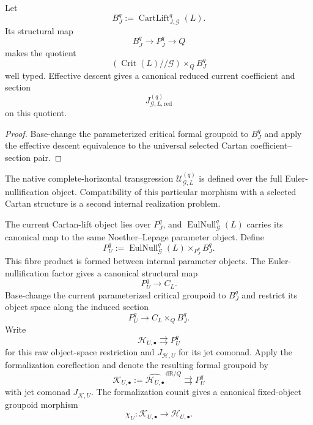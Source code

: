 \begin{theorem}
\label{thm:symmetry-noether-universal-reduced-current}
Let
\[
B_J^q:=\operatorname{CartLift}_{J,\mathcal G}^{q}(L).
\]
Its structural map
\[
B_J^q\to P_J^q\to Q
\]
makes the quotient
\[
\left(
\operatorname{Crit}(L)//\mathcal G
\right)\times_QB_J^q
\]
well typed.  Effective descent gives a canonical reduced current coefficient and
section
\[
\boxed{
J_{\mathcal G,L,\mathrm{red}}^{(q)}
}
\]
on this quotient.
\end{theorem}

\begin{proof}
Base-change the parameterized critical formal groupoid to $B_J^q$ and apply the
effective descent equivalence to the universal selected Cartan
coefficient--section pair.
\end{proof}

The native complete-horizontal transgression
$\mathcal U_{\mathcal G,L}^{(q)}$ is defined over the full
Euler-nullification object.  Compatibility of this particular morphism with a
selected Cartan structure is a second internal realization problem.

\begin{construction}
\label{constr:symmetry-noether-common-parameter-object-for-current-transgression}
The current Cartan-lift object lies over $P_J^q$, and
$\operatorname{EulNull}_{\mathcal G}^{q}(L)$ carries its canonical map to the same
Noether--Lepage parameter object.  Define
\[
\boxed{
P_U^q
:=
\operatorname{EulNull}_{\mathcal G}^{q}(L)
\times_{P_J^q}
B_J^q.
}
\]
This fibre product is formed between internal parameter objects.  The
Euler-nullification factor gives a canonical structural map
\[
P_U^q\longrightarrow C_L.
\]
Base-change the current parameterized critical groupoid to $B_J^q$ and restrict its
object space along the induced section
\[
P_U^q\longrightarrow C_L\times_QB_J^q.
\]
Write
\[
\mathcal H_{U,\bullet}\rightrightarrows P_U^q
\]
for this raw object-space restriction and $J_{\mathcal H,U}$ for its jet comonad.
Apply the formalization coreflection and denote the resulting formal groupoid by
\[
\mathcal K_{U,\bullet}
:=
\widehat{\mathcal H_{U,\bullet}}^{\,\mathrm{dR}/Q}
\rightrightarrows P_U^q
\]
with jet comonad $J_{\mathcal K,U}$.  The formalization counit gives a canonical
fixed-object groupoid morphism
\[
\chi_U:
\mathcal K_{U,\bullet}
\longrightarrow
\mathcal H_{U,\bullet}.
\]
\end{construction}

